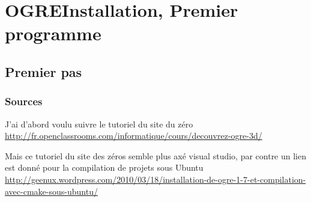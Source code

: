 \documentclass[10pt,a4paper]{report}
\begin{document}
\begin{comment}
\part{A Essayer}
Essayer d´ins\'erer le code suivant dans le code d´exemple une tete devrait etre affich\'ee:
Entity *head= msceneMgr->createEntity(''Tete'', ''ogrehead.mesh'' ) ;
sceneNode *node= msceneMgr->getRootsceneNode( )->createChildsceneNode( ''nodeTete '' , Vector3 : :ZERO, Quaternion : : IDENTITY) ;
node->attachObject ( head );



Essayer d´ins\'erer le code suivant dans le code d´exemple un plan recouvert d´herbe devrait etre cr\'e\'e:
Plane plan ( Vector3 : :UNIT_Y, 0) ;
MeshManager : : g e t S i ng l e t o n ( ) . c r e a t ePl ane ( '' s o l '' ,  -
ResourceGroupManager : :DEFAULT_RESOURCE_GROUP_NAME,  -
plan , 500 , 500 , 1 , 1 , true , 1 , 1 , 1 , Vector3 : :UNIT_Z) -
;

Entity *ent= msceneMgr->c r e a t eEnt i t y ( '' Ent i t eSo l '' , '' s o l '' ) ;
ent->setMaterialName ( ''Examples/GrassFloor '' ) ;
node = msceneMgr->getRootsceneNode ( )->createChi ldsceneNode ( ) ;
node->at tachObj e c t ( ent ) ;


\end{comment}




\part{OGRE\newline Installation, Premier programme}

\chapter{Premier pas}
\section{Sources}
J'ai d'abord voulu suivre le tutoriel du site du z\'ero
\url{http://fr.openclassrooms.com/informatique/cours/decouvrez-ogre-3d/}\newline

Mais ce tutoriel du site des z\'eros semble plus ax\'e visual studio, par contre un lien est donn\'e pour la compilation de projets sous Ubuntu \url{http://geenux.wordpress.com/2010/03/18/installation-de-ogre-1-7-et-compilation-avec-cmake-sous-ubuntu/}
\end{document}

